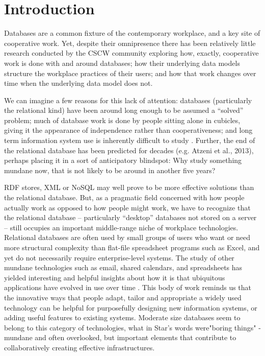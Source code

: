 \section{Introduction}

Databases are a common fixture of the contemporary workplace, and a key site of cooperative work. Yet, despite their omnipresence there has been relatively little research conducted by the CSCW community exploring how, exactly, cooperative work is done with and around databases;  how their underlying data models structure the workplace practices of their users; and how that work changes over time when the underlying data model does not. 

We can imagine a few reasons for this lack of attention: databases (particularly the relational kind) have been around long enough to be assumed a “solved” problem; much of database work is done by people sitting alone in cubicles, giving it the appearance of independence rather than cooperativeness; and long term information system use is inherently difficult to study \cite{Pipek_2002}. Further, the end of the relational database has been predicted for decades (e.g. Atzeni et al., 2013), perhaps placing it in a sort of anticipatory blindspot: Why study something mundane now, that is not likely to be around in another five years? 

RDF stores, XML or NoSQL may well prove to be more effective solutions than the relational database. But, as a pragmatic field concerned with how people actually work as opposed to how people might work, we have to recognize that the relational database – particularly “desktop” databases not stored on a server – still occupies an important middle-range niche of workplace technologies. Relational databases are often used by small groups of users who want or need more structural complexity than flat-file spreadsheet programs such as Excel, and yet do not necessarily require enterprise-level systems. The study of other mundane technologies such as email, shared calendars, and spreadsheets has yielded interesting and helpful insights about how it is that ubiquitous applications have evolved in use over time  \cite{bellotti2005quality, palen1999social, nardi1991twinkling}. This body of work reminds us that the innovative ways that people adapt, tailor and appropriate a widely used technology can be helpful for purposefully designing new information systems, or adding useful features to existing systems. Moderate size databases seem to  belong to this category of technologies, what in Star's words were"boring things" \cite{star1999ethnography} -  mundane and often overlooked, but important elements that contribute to collaboratively creating effective infrastructures.  

